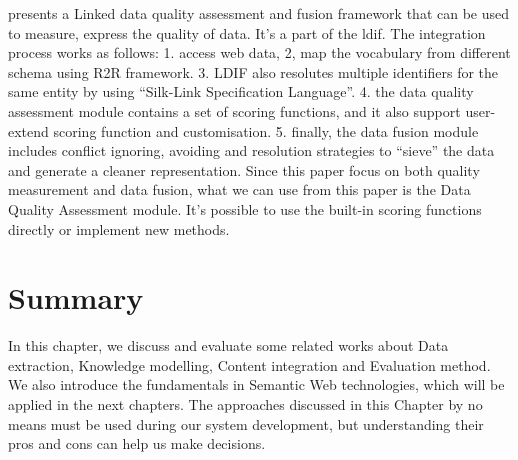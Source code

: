 \cite{mendes2012} presents a Linked data quality assessment and fusion framework that can be used to measure, express the quality of data. It's a part of the \gls{ldif}. The integration process works as follows: 1. access web data, 2, map the vocabulary from different schema using R2R framework. 3. LDIF also resolutes multiple identifiers for the same entity by using ``Silk-Link Specification Language''. 4. the data quality assessment module contains a set of scoring functions, and it also support user-extend scoring function and customisation. 5. finally, the data fusion module includes conflict ignoring, avoiding and resolution strategies to ``sieve'' the data and generate a cleaner representation. Since this paper focus on both quality measurement and data fusion, what we can use from this paper is the Data Quality Assessment module. It's possible to use the built-in scoring functions directly or implement new methods.

\section{Summary}
In this chapter, we discuss and evaluate some related works about Data extraction, Knowledge modelling, Content integration and Evaluation method. We also introduce the fundamentals in Semantic Web technologies, which will be applied in the next chapters. The approaches discussed in this Chapter by no means must be used during our system development, but understanding their pros and cons can help us make decisions.